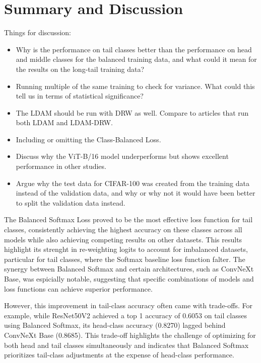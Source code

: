 \section{Summary and Discussion}
Things for discussion:

\begin{itemize}
    \item Why is the performance on tail classes better than the performance on head and middle classes for the balanced training data, and what could it mean for the results on the long-tail training data?
    \item Running multiple of the same training to check for variance. What could this tell us in terms of statistical significance?
    \item The LDAM should be run with DRW as well. Compare to articles that run both LDAM and LDAM-DRW.
    \item Including or omitting the Class-Balanced Loss.
    \item Discuss why the ViT-B/16 model underperforms but shows excellent performance in other studies.
    \item Argue why the test data for CIFAR-100 was created from the training data instead of the validation data, and why or why not it would have been better to split the validation data instead.
\end{itemize}


The Balanced Softmax Loss proved to be the most effective loss function for tail classes, consistently achieving the highest accuracy on these classes across all models while also achieving competing results on other datasets. This results highlight its strenght in re-weighting logits to account for imbalanced datasets, particular for tail classes, where the Softmax baseline loss function falter. The synergy between Balanced Softmax and certain architectures, such as ConvNeXt Base, was espicially notable, suggesting that specific combinations of models and loss functions can achieve superior performance.

However, this improvement in tail-class accuracy often came with trade-offs. For example, while ResNet50V2 achieved a top 1 accuracy of 0.6053 on tail classes using Balanced Softmax, its head-class accuracy (0.8270) lagged behind ConvNeXt Base (0.8685). This trade-off highlights the challenge of optimizing for both head and tail classes simultaneously and indicates that Balanced Softmax prioritizes tail-class adjustments at the expense of head-class performance. 

